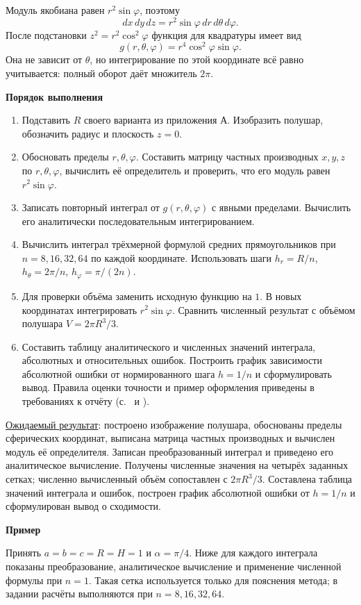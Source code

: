 \documentclass[12pt,a4paper]{article}
\newcommand{\taskhead}[1]{\par\textbf{#1}\par}
\begin{document}
Модуль якобиана равен $r^2\sin\varphi$, поэтому
\[
dx\,dy\,dz=r^2\sin\varphi\,dr\,d\theta\,d\varphi.
\]
После подстановки $z^2=r^2\cos^2\varphi$ функция для квадратуры имеет вид
\[
g(r,\theta,\varphi)=r^4\cos^2\varphi\sin\varphi.
\]
Она не зависит от $\theta$, но интегрирование по этой координате всё равно
учитывается: полный оборот даёт множитель $2\pi$.

\taskhead{Порядок выполнения}
\begin{enumerate}
\item Подставить $R$ своего варианта из приложения А.
Изобразить полушар, обозначить радиус и плоскость $z=0$.
\item Обосновать пределы $r,\theta,\varphi$. Составить матрицу частных
производных $x,y,z$ по $r,\theta,\varphi$, вычислить её определитель
и проверить, что его модуль равен $r^2\sin\varphi$.
\item Записать повторный интеграл от $g(r,\theta,\varphi)$ с явными пределами.
Вычислить его аналитически последовательным интегрированием.
\item Вычислить интеграл трёхмерной формулой средних прямоугольников
при $n=8,16,32,64$ по каждой координате. Использовать шаги
$h_r=R/n$, $h_\theta=2\pi/n$, $h_\varphi=\pi/(2n)$.
\item Для проверки объёма заменить исходную функцию на $1$.
В новых координатах интегрировать $r^2\sin\varphi$.
Сравнить численный результат с объёмом полушара $V=2\pi R^3/3$.
\item Составить таблицу аналитического и численных значений интеграла,
абсолютных и относительных ошибок. Построить график зависимости абсолютной
ошибки от нормированного шага $h=1/n$ и сформулировать вывод.
Правила оценки точности и пример оформления приведены в требованиях
к отчёту (с.~\pageref{sec:accuracy} и \pageref{sec:error-example}).
\end{enumerate}
\underline{Ожидаемый результат}: построено изображение полушара,
обоснованы пределы сферических координат, выписана матрица частных
производных и вычислен модуль её определителя. Записан преобразованный
интеграл и приведено его аналитическое вычисление.
Получены численные значения на четырёх заданных сетках;
численно вычисленный объём сопоставлен с $2\pi R^3/3$.
Составлена таблица значений интеграла и ошибок, построен график абсолютной
ошибки от $h=1/n$ и сформулирован вывод о сходимости.

\taskhead{Пример}
Принять $a=b=c=R=H=1$ и $\alpha=\pi/4$.
Ниже для каждого интеграла показаны преобразование, аналитическое вычисление
и применение численной формулы при $n=1$. Такая сетка используется только
для пояснения метода; в задании расчёты выполняются при $n=8,16,32,64$.
\end{document}
